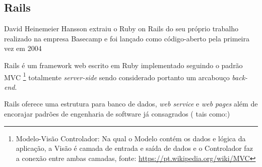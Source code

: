 \subsection{Rails}

\par David Heinemeier Hansson extraiu o Ruby on Rails do seu próprio trabalho realizado na empresa Basecamp e foi lançado como código-aberto pela primeira vez em 2004
\par Rails é um framework web escrito em Ruby implementado seguindo o padrão MVC \footnote{Modelo-Visão Controlador: Na qual o Modelo contém os dados e lógica da aplicação, a Visão é camada de entrada e saída de dados e o Controlador faz a conexão entre ambas camadas, fonte: \url{https://pt.wikipedia.org/wiki/MVC} } totalmente \emph{server-side} sendo considerado portanto um arcabouço \emph{ back-end}.
\par Rails oferece uma estrutura para banco de dados, \emph{web service} e \emph{web pages} além de encorajar padrões de engenharia de software já consagrados (  tais como:\cite{railswiki})
